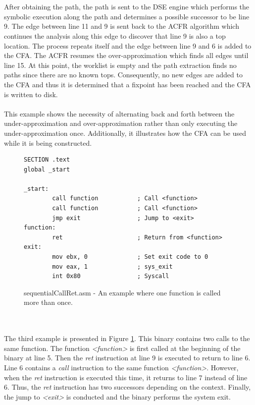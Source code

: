 \documentclass{kththesis}
\renewcommand{\it}[1]{\textit{#1}}
\begin{document}
\\ \\
After obtaining the path, the path is sent to the DSE engine which performs the symbolic execution along the path and determines a possible successor to be line 9. The edge between line 11 and 9 is sent back to the ACFR algorithm which continues the analysis along this edge to discover that line 9 is also a top location. The process repeats itself and the edge between line 9 and 6 is added to the CFA. The ACFR resumes the over-approximation which finds all edges until line 15. At this point, the worklist is empty and the path extraction finds no paths since there are no known tops. Consequently, no new edges are added to the CFA and thus it is determined that a fixpoint has been reached and the CFA is written to disk.
\\ \\
This example shows the necessity of alternating back and forth between the under-approximation and over-approximation rather than only executing the under-approximation once. Additionally, it illustrates how the CFA can be used while it is being constructed.
\begin{figure}[ht]
    \centering
\begin{tcolorbox}
\begin{verbatim}
SECTION .text
global _start

_start:
        call function           ; Call <function>
        call function           ; Call <function>
        jmp exit                ; Jump to <exit>
function:
        ret                     ; Return from <function>
exit:
        mov ebx, 0              ; Set exit code to 0
        mov eax, 1              ; sys_exit
        int 0x80                ; Syscall
\end{verbatim}
\end{tcolorbox}
\caption{sequentialCallRet.asm - An example where one function is called more than once.}
    \label{fig:sequentialCallRet}
\end{figure}
\\ \\
The third example is presented in Figure \ref{fig:sequentialCallRet}. This binary contains two calls to the same function. The function \it{<function>} is first called at the beginning of the binary at line 5. Then the \it{ret} instruction at line 9 is executed to return to line 6. Line 6 contains a \it{call} instruction to the same function \it{<function>}. However, when the \it{ret} instruction is executed this time, it returns to line 7 instead of line 6. Thus, the \it{ret} instruction has two successors depending on the context. Finally, the jump to \it{<exit>} is conducted and the binary performs the system exit.
\end{document}

